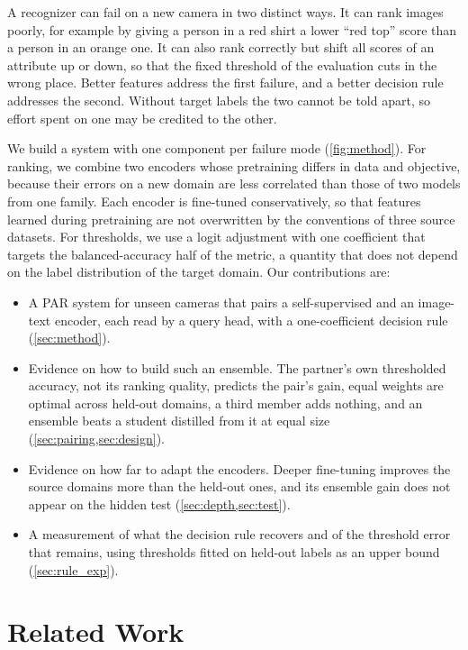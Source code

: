 \documentclass[10pt,twocolumn,letterpaper]{article}
\begin{document}
A recognizer can fail on a new camera in two distinct ways. It can rank images poorly, for example by giving a person in a red shirt a lower ``red top'' score than a person in an orange one. It can also rank correctly but shift all scores of an attribute up or down, so that the fixed threshold of the evaluation cuts in the wrong place. Better features address the first failure, and a better decision rule addresses the second. Without target labels the two cannot be told apart, so effort spent on one may be credited to the other.

We build a system with one component per failure mode (\cref{fig:method}). For ranking, we combine two encoders whose pretraining differs in data and objective, because their errors on a new domain are less correlated than those of two models from one family. Each encoder is fine-tuned conservatively, so that features learned during pretraining are not overwritten by the conventions of three source datasets. For thresholds, we use a logit adjustment with one coefficient that targets the balanced-accuracy half of the metric, a quantity that does not depend on the label distribution of the target domain. Our contributions are:
\begin{itemize}
\item A PAR system for unseen cameras that pairs a self-supervised and an image-text encoder, each read by a query head, with a one-coefficient decision rule (\cref{sec:method}).
\item Evidence on how to build such an ensemble. The partner's own thresholded accuracy, not its ranking quality, predicts the pair's gain, equal weights are optimal across held-out domains, a third member adds nothing, and an ensemble beats a student distilled from it at equal size (\cref{sec:pairing,sec:design}).
\item Evidence on how far to adapt the encoders. Deeper fine-tuning improves the source domains more than the held-out ones, and its ensemble gain does not appear on the hidden test (\cref{sec:depth,sec:test}).
\item A measurement of what the decision rule recovers and of the threshold error that remains, using thresholds fitted on held-out labels as an upper bound (\cref{sec:rule_exp}).
\end{itemize}

\section{Related Work}
\label{sec:related}
\end{document}
